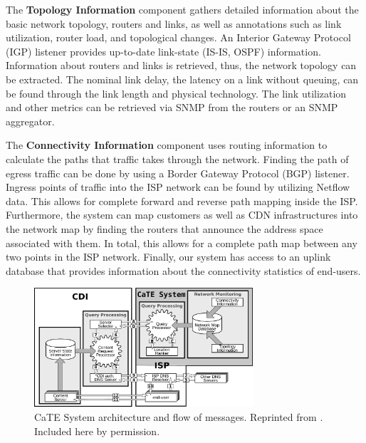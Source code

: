 The {\bf Topology Information} component gathers detailed information about the
basic network topology, \ie routers and links, as well as annotations such as
link utilization, router load, and topological changes.  An Interior Gateway
Protocol (IGP) listener provides up-to-date link-state (\ie IS-IS, OSPF)
information.  Information about routers and links is retrieved, thus, the
network topology can be extracted.  The nominal link delay, \ie the latency on
a link without queuing, can be found through the link length and physical
technology.  The link utilization and other metrics can be retrieved via SNMP
from the routers or an SNMP aggregator.

The {\bf Connectivity Information} component uses routing information to
calculate the paths that traffic takes through the network. Finding the path of
egress traffic can be done by using a Border Gateway Protocol (BGP) listener.
Ingress points of traffic into the ISP network can be found by utilizing
Netflow data. This allows for complete forward and reverse path mapping inside
the ISP.  Furthermore, the system can map customers as well as CDN
infrastructures into the network map by finding the routers that announce the
address space associated with them. In total, this allows for a complete path
map between any two points in the ISP network.  Finally, our system has access
to an uplink database that provides information about the connectivity
statistics of end-users.


\begin{figure}[tbp]
    \center \includegraphics[width=3.2in]{figures-pdf/CaTE_Schematic}
  \vspace{-0.1in}
    \caption{CaTE System architecture and flow of messages. Reprinted from \cite{Cate-CCR}. Included here by permission.}
    \label{fig:CaTE-architecture}
    \vspace{-0.2in}
\end{figure}

